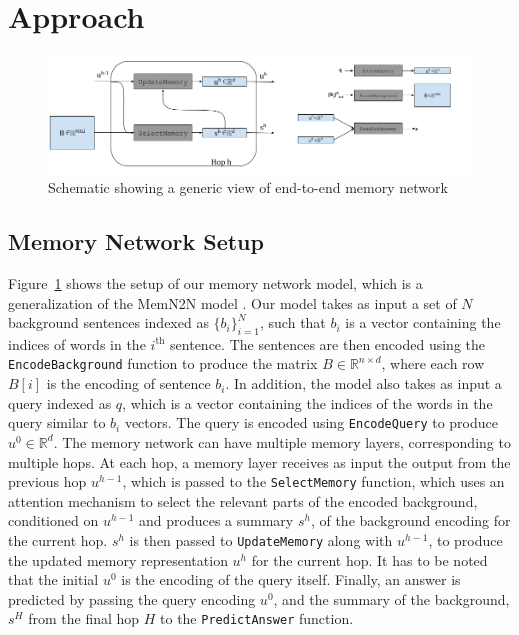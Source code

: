 \section{Approach}
\begin{figure}
\begin{center}
  \includegraphics[width=6in]{figures/memory_network_generic.png}
  \caption{Schematic showing a generic view of end-to-end memory network}
  \label{fig:memnet}
  \end{center}
\end{figure}
\subsection{Memory Network Setup}
Figure~\ref{fig:memnet} shows the setup of our memory network model, which is a
generalization of the MemN2N model \citep{sukhbaatar2015end}. Our model takes as
input a set of $N$ background sentences indexed as $\{b_i\}_{i=1}^N$, such that
$b_i$ is a vector containing the indices of words in the $i^\text{th}$ sentence.
The sentences are then encoded using the \texttt{EncodeBackground} function to
produce the matrix $B \in \mathbb{R}^{n \times d}$, where each row $B[i]$ is the
encoding of sentence $b_i$. In addition, the model also takes as input a query
indexed as $q$, which is a vector containing the indices of the words in the
query similar to $b_i$ vectors. The query is encoded using \texttt{EncodeQuery}
to produce $u^0 \in \mathbb{R}^d$. The memory network can have multiple memory
layers, corresponding to multiple hops. At each hop, a memory layer receives as
input the output from the previous hop $u^{h-1}$, which is passed to the
\texttt{SelectMemory} function, which uses an attention mechanism to select the
relevant parts of the encoded background, conditioned on $u^{h-1}$ and produces
a summary $s^h$, of the background encoding for the current hop. $s^h$ is then
passed to \texttt{UpdateMemory} along with $u^{h-1}$, to produce the updated
memory representation $u^h$ for the current hop. It has to be noted that the
initial $u^0$ is the encoding of the query itself. Finally, an answer is
predicted by passing the query encoding $u^0$, and the summary of the
background, $s^H$ from the final hop $H$ to the \texttt{PredictAnswer} function.

